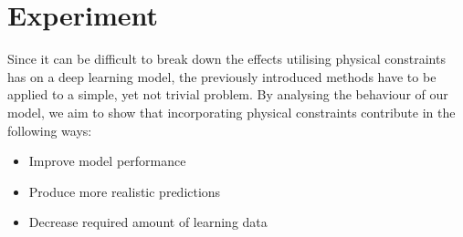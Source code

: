 \label{section:experiment}
\section{Experiment}

Since it can be difficult to break down the effects utilising physical constraints has on a deep learning model, the previously introduced methods have to be applied to a simple, yet not trivial problem. By analysing the behaviour of our model, we aim to show that incorporating physical constraints contribute in the following ways:
\begin{itemize}
	\item Improve model performance
	\item Produce more realistic predictions
	\item Decrease required amount of learning data
\end{itemize}


